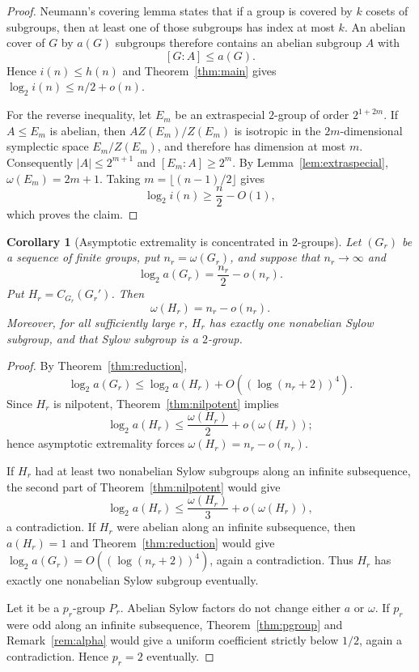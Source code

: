 \documentclass[11pt]{article}
\newtheorem{corollary}[theorem]{Corollary}
\theoremstyle{definition}
\theoremstyle{remark}
\begin{document}
\begin{proof}
Neumann's covering lemma \cite{Neumann1954} states that if a group is covered by $k$ cosets of subgroups, then at least one of those subgroups has index at most $k$. An abelian cover of $G$ by $a(G)$ subgroups therefore contains an abelian subgroup $A$ with
\[
[G:A]\le a(G).
\]
Hence $i(n)\le h(n)$ and Theorem~\ref{thm:main} gives $\log_2i(n)\le n/2+o(n)$.

For the reverse inequality, let $E_m$ be an extraspecial $2$-group of order $2^{1+2m}$. If $A\le E_m$ is abelian, then $AZ(E_m)/Z(E_m)$ is isotropic in the $2m$-dimensional symplectic space $E_m/Z(E_m)$, and therefore has dimension at most $m$. Consequently $|A|\le2^{m+1}$ and $[E_m:A]\ge2^m$. By Lemma~\ref{lem:extraspecial}, $\omega(E_m)=2m+1$. Taking $m=\lfloor(n-1)/2\rfloor$ gives
\[
\log_2i(n)\ge\frac n2-O(1),
\]
which proves the claim.
\end{proof}

\begin{corollary}[Asymptotic extremality is concentrated in 2-groups]\label{cor:extremality}
Let $(G_r)$ be a sequence of finite groups, put $n_r=\omega(G_r)$, and suppose that $n_r\to\infty$ and
\[
\log_2a(G_r)=\frac{n_r}{2}-o(n_r).
\]
Put $H_r=C_{G_r}(G_r')$. Then
\[
\omega(H_r)=n_r-o(n_r).
\]
Moreover, for all sufficiently large $r$, $H_r$ has exactly one nonabelian Sylow subgroup, and that Sylow subgroup is a $2$-group.
\end{corollary}

\begin{proof}
By Theorem~\ref{thm:reduction},
\[
\log_2a(G_r)\le\log_2a(H_r)+O((\log(n_r+2))^4).
\]
Since $H_r$ is nilpotent, Theorem~\ref{thm:nilpotent} implies
\[
\log_2a(H_r)\le\frac{\omega(H_r)}2+o(\omega(H_r));
\]
hence asymptotic extremality forces $\omega(H_r)=n_r-o(n_r)$.

If $H_r$ had at least two nonabelian Sylow subgroups along an infinite subsequence, the second part of Theorem~\ref{thm:nilpotent} would give
\[
\log_2a(H_r)\le\frac{\omega(H_r)}3+o(\omega(H_r)),
\]
a contradiction. If $H_r$ were abelian along an infinite subsequence, then $a(H_r)=1$ and Theorem~\ref{thm:reduction} would give $\log_2a(G_r)=O((\log(n_r+2))^4)$, again a contradiction. Thus $H_r$ has exactly one nonabelian Sylow subgroup eventually.

Let it be a $p_r$-group $P_r$. Abelian Sylow factors do not change either $a$ or $\omega$. If $p_r$ were odd along an infinite subsequence, Theorem~\ref{thm:pgroup} and Remark~\ref{rem:alpha} would give a uniform coefficient strictly below $1/2$, again a contradiction. Hence $p_r=2$ eventually.
\end{proof}
\end{document}
